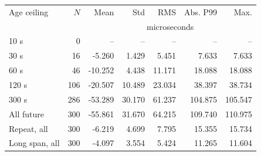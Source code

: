 \begin{center}\small
\begin{tabular}{lrrrrrr}\toprule
Age ceiling & $N$ & Mean & Std & RMS & Abs. P99 & Max. \\
 & & \multicolumn{5}{c}{microseconds} \\ \midrule
10 s & 0 & -- & -- & -- & -- & -- \\
30 s & 16 & -5.260 & 1.429 & 5.451 & 7.633 & 7.633 \\
60 s & 46 & -10.252 & 4.438 & 11.171 & 18.088 & 18.088 \\
120 s & 106 & -20.507 & 10.489 & 23.034 & 38.397 & 38.734 \\
300 s & 286 & -53.289 & 30.170 & 61.237 & 104.875 & 105.547 \\
All future & 300 & -55.861 & 31.670 & 64.215 & 109.740 & 110.975 \\
Repeat, all & 300 & -6.219 & 4.699 & 7.795 & 15.355 & 15.734 \\
Long span, all & 300 & -4.097 & 3.554 & 5.424 & 11.265 & 11.604 \\
\bottomrule\end{tabular}\end{center}
